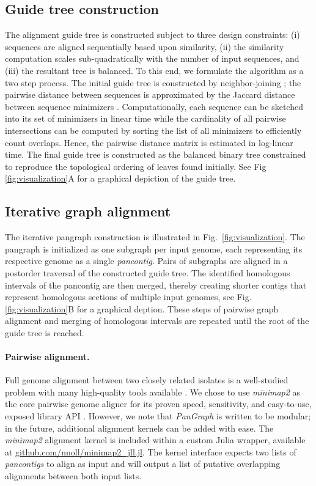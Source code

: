 \documentclass[aps,rmp,reprint,superscriptaddress,notitlepage,10pt]{revtex4-1}
\begin{document}
\subsection{Guide tree construction}
The alignment guide tree is constructed subject to three design constraints: (i) sequences are aligned sequentially based upon similarity, (ii) the similarity computation scales sub-quadratically with the number of input sequences, and (iii) the resultant tree is balanced.
To this end, we formulate the algorithm as a two step process.
The initial guide tree is constructed by neighbor-joining \cite{saitou1987neighbor}; the pairwise distance between sequences is approximated by the Jaccard distance between sequence minimizers \cite{roberts2004reducing}.
Computationally, each sequence can be sketched into its set of minimizers in linear time while the cardinality of all pairwise intersections can be computed by sorting the list of all minimizers to efficiently count overlaps.
Hence, the pairwise distance matrix is estimated in log-linear time.
The final guide tree is constructed as the balanced binary tree constrained to reproduce the topological ordering of leaves found initially.
See Fig \ref{fig:visualization}A for a graphical depiction of the guide tree.

\subsection{Iterative graph alignment}
The iterative pangraph construction is illustrated in Fig.~\ref{fig:visualization}.
The pangraph is initialized as one subgraph per input genome, each representing its respective genome as a single \emph{pancontig}.
Pairs of subgraphs are aligned in a postorder traversal of the constructed guide tree.
The identified homologous intervals of the pancontig are then merged, thereby creating shorter contigs that represent homologous sections of multiple input genomes, see Fig. \ref{fig:visualization}B for a graphical deption. 
These steps of pairwise graph alignment and merging of homologous intervals are repeated until the root of the guide tree is reached. 

\paragraph{Pairwise alignment.}
Full genome alignment between two closely related isolates is a well-studied problem with many high-quality tools available \cite{li2018minimap2,marccais2018mummer4}.
We chose to use \emph{minimap2} as the core pairwise genome aligner for its proven speed, sensitivity, and easy-to-use, exposed library API \cite{li2018minimap2}.
However, we note that \emph{PanGraph} is written to be modular; in the future, additional alignment kernels can be added with ease.
The \emph{minimap2} alignment kernel is included within a custom Julia wrapper, available at \url{github.com/nnoll/minimap2_jll.jl}.
The kernel interface expects two lists of \emph{pancontigs} to align as input and will output a list of putative overlapping alignments between both input lists.
\end{document}
